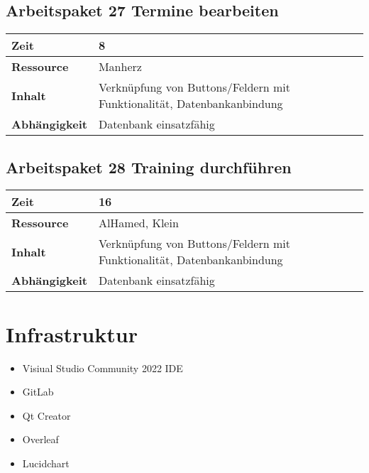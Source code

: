 \documentclass[12pt,a4paper,onecolumn]{article}
\begin{document}
\subsection{Arbeitspaket 27 Termine bearbeiten}
\begin{tabularx}{\textwidth}{|l|X|}
\hline
     \textbf{Zeit} & 8\\
     \hline
     \textbf{Ressource} & Manherz\\
     \hline
     \textbf{Inhalt} &  Verknüpfung von Buttons/Feldern mit Funktionalität, Datenbankanbindung\\
     \hline
     \textbf{Abhängigkeit} & Datenbank einsatzfähig\\
\hline
\end{tabularx}

\subsection{Arbeitspaket 28 Training durchführen}
\begin{tabularx}{\textwidth}{|l|X|}
\hline
     \textbf{Zeit} & 16\\
     \hline
     \textbf{Ressource} & AlHamed, Klein\\
     \hline
     \textbf{Inhalt} &  Verknüpfung von Buttons/Feldern mit Funktionalität, Datenbankanbindung\\
     \hline
     \textbf{Abhängigkeit} & Datenbank einsatzfähig\\
\hline
\end{tabularx}

\section{Infrastruktur}
\begin{itemize}
    \item Visiual Studio Community 2022 IDE
    \item GitLab
    \item Qt Creator
    \item Overleaf
    \item Lucidchart
\end{itemize}
\end{document}
